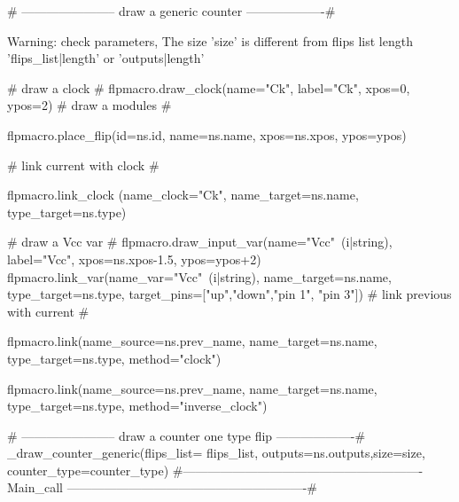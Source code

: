 {%
{%
{%
{# -----------------------
 draw a generic counter
-------------------#}
{%

{%
 Warning: check parameters, The size '{{size}}' is different from flips list length '{{flips_list|length}}' or
 '{{outputs|length}}'
{%
    {# draw a clock #}
    {{ flpmacro.draw_clock(name="Ck", label="Ck", xpos=0, ypos=2)}}
    {# draw a modules #}
    {%
    {%
    {%
        {%
        {%
        {%
        {%
        {{ flpmacro.place_flip(id=ns.id, name=ns.name, xpos=ns.xpos, ypos=ypos)}}

        {# link current with clock #}
        {%
        {{ flpmacro.link_clock (name_clock="Ck", name_target=ns.name, type_target=ns.type)}}
        {%

        {# draw a Vcc var #}
        {{ flpmacro.draw_input_var(name="Vcc"~(i|string), label="Vcc", xpos=ns.xpos-1.5, ypos=ypos+2)}}
        {{ flpmacro.link_var(name_var="Vcc"~(i|string), name_target=ns.name, type_target=ns.type, target_pins=["up","down","pin 1", "pin 3"])}}
        {# link previous with current #}
        {%
             {{ flpmacro.link(name_source=ns.prev_name, name_target=ns.name, type_target=ns.type, method="clock")}}
        {%
             {{ flpmacro.link(name_source=ns.prev_name, name_target=ns.name, type_target=ns.type, method="inverse_clock")}}
        {%
        {%
        {%
    {%

{%
{%

{# -----------------------
 draw a counter one type flip
-------------------#}
{%
{%
{%
{%
    {%
{%
{{ _draw_counter_generic(flips_list= flips_list, outputs=ns.outputs,size=size, counter_type=counter_type)}}
{%
{#----------------------------------------------------------
 Main_call
----------------------------------------------------------#}
}}}}}}}}}}}}}}}}}}}}}}}}}}}}}}
